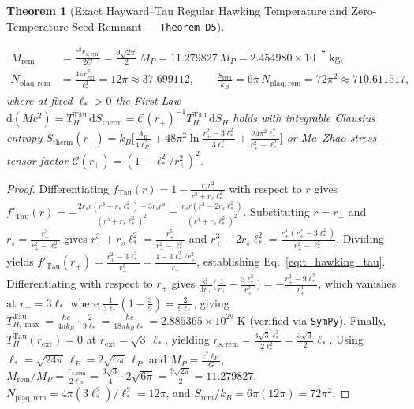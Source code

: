 \documentclass[11pt,a4paper]{article}
\newtheorem{theorem}{Theorem}[section]
\theoremstyle{remark}
\begin{document}
\begin{theorem}[Exact Hayward--Tau Regular Hawking Temperature and Zero-Temperature Seed Remnant --- \texttt{Theorem D5}]
\begin{enumerate}
\begin{align}
    M_{\mathrm{rem}} &= \frac{c^2 r_{s,\mathrm{rem}}}{2G} = \frac{9\sqrt{2\pi}}{2}\,M_P = 11.279827\,M_P = 2.454980 \times 10^{-7}\;\mathrm{kg}, \nonumber\\
    N_{\mathrm{plaq,rem}} &= \frac{4\pi r_{\mathrm{ext}}^2}{\ell_*^2} = 12\pi \approx 37.699112, \qquad
    \frac{S_{\mathrm{rem}}}{k_B} = 6\pi\,N_{\mathrm{plaq,rem}} = 72\pi^2 \approx 710.611517,
    \label{eq:extremal_remnant}
  \end{align}
  where at fixed $\ell_* > 0$ the First Law $\mathrm{d}(Mc^2) = T_H^{\mathrm{Tau}}\,\mathrm{d}S_{\mathrm{therm}} = \mathcal{C}(r_+)^{-1}T_H^{\mathrm{Tau}}\,\mathrm{d}S_H$ holds with integrable Clausius entropy $S_{\mathrm{therm}}(r_+) = k_B\bigl[\frac{A_H}{4\ell_P^2} + 48\pi^2\ln\frac{r_+^2-3\ell_*^2}{3\ell_*^2} + \frac{24\pi^2\ell_*^2}{r_+^2-\ell_*^2}\bigr]$ or Ma--Zhao stress-tensor factor $\mathcal{C}(r_+) = (1-\ell_*^2/r_+^2)^2$.
\end{enumerate}
\end{theorem}

\begin{proof}
Differentiating $f_{\mathrm{Tau}}(r) = 1 - \frac{r_s r^2}{r^3 + r_s\ell_*^2}$ with respect to $r$ gives $f'_{\mathrm{Tau}}(r) = -\frac{2r_s r(r^3 + r_s\ell_*^2) - 3r_s r^4}{(r^3 + r_s\ell_*^2)^2} = \frac{r_s r(r^3 - 2r_s\ell_*^2)}{(r^3 + r_s\ell_*^2)^2}$. Substituting $r = r_+$ and $r_s = \frac{r_+^3}{r_+^2 - \ell_*^2}$ gives $r_+^3 + r_s\ell_*^2 = \frac{r_+^5}{r_+^2 - \ell_*^2}$ and $r_+^3 - 2r_s\ell_*^2 = \frac{r_+^3(r_+^2 - 3\ell_*^2)}{r_+^2 - \ell_*^2}$. Dividing yields $f'_{\mathrm{Tau}}(r_+) = \frac{r_+^2 - 3\ell_*^2}{r_+^3} = \frac{1 - 3\ell_*^2/r_+^2}{r_+}$, establishing Eq.~\eqref{eq:t_hawking_tau}. Differentiating with respect to $r_+$ gives $\frac{\mathrm{d}}{\mathrm{d}r_+}\bigl(\frac{1}{r_+} - \frac{3\ell_*^2}{r_+^3}\bigr) = -\frac{r_+^2 - 9\ell_*^2}{r_+^4}$, which vanishes at $r_+ = 3\ell_*$ where $\frac{1}{3\ell_*}(1 - \frac{3}{9}) = \frac{2}{9\ell_*}$, giving $T_{H,\max}^{\mathrm{Tau}} = \frac{\hbar c}{4\pi k_B}\cdot\frac{2}{9\ell_*} = \frac{\hbar c}{18\pi k_B\ell_*} = 2.885365 \times 10^{29}\;\mathrm{K}$ (verified via \texttt{SymPy}). Finally, $T_H^{\mathrm{Tau}}(r_{\mathrm{ext}}) = 0$ at $r_{\mathrm{ext}} = \sqrt{3}\,\ell_*$, yielding $r_{s,\mathrm{rem}} = \frac{3\sqrt{3}\ell_*^3}{2\ell_*^2} = \frac{3\sqrt{3}}{2}\ell_*$. Using $\ell_* = \sqrt{24\pi}\,\ell_P = 2\sqrt{6\pi}\,\ell_P$ and $M_P = \frac{c^2\ell_P}{G}$, $M_{\mathrm{rem}}/M_P = \frac{r_{s,\mathrm{rem}}}{2\ell_P} = \frac{3\sqrt{3}}{4}\cdot 2\sqrt{6\pi} = \frac{9\sqrt{2\pi}}{2} = 11.279827$, $N_{\mathrm{plaq,rem}} = 4\pi(3\ell_*^2)/\ell_*^2 = 12\pi$, and $S_{\mathrm{rem}}/k_B = 6\pi(12\pi) = 72\pi^2$.
\end{proof}
\end{document}
